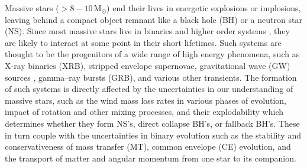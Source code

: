 \documentclass[linenumbers,trackchanges,twocolumn]{aastex701}
\newcommand{\Mdot}{\mathrm{M}_{\odot}}
\begin{document}
Massive stars ($> 8-10\,\Mdot$) end their lives in energetic explosions or implosions, leaving behind a compact object remnant like a black hole (BH) or a neutron star (NS). Since most massive stars live in binaries and higher order systems \cite{2012Sci...337..444S,2023ASPC..534..275O}, they are likely to interact at some point in their short lifetimes. Such systems are thought to be the progenitors of a wide range of high energy phenomena, such as X-ray binaries (XRB), stripped envelope supernovae, gravitational wave (GW) sources \cite{2023PhRvX..13d1039A}, gamma--ray bursts (GRB), and various other transients. The formation of such systems is directly affected by the uncertainties in our understanding of massive stars, such as the wind mass loss rates in various phases of evolution, impact of rotation and other mixing processes, and their explodability which determines whether they form NS's, direct collapse BH's, or fallback BH's. These in turn couple with the uncertainties in binary evolution such as the stability and conservativeness of mass transfer (MT), common envelope (CE) evolution, and the transport of matter and angular momentum from one star to its companion. 
\end{document}
